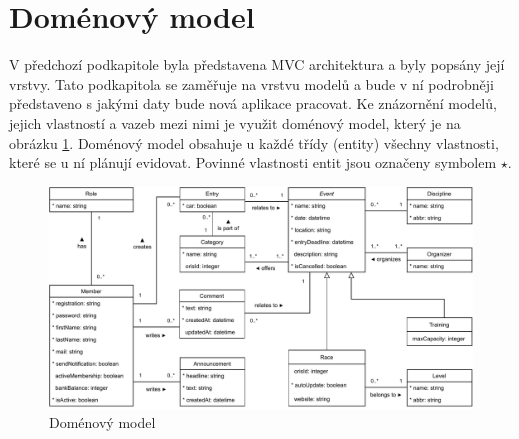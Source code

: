 \section{Doménový model}
V předchozí podkapitole byla představena MVC architektura a byly popsány její vrstvy. Tato podkapitola se zaměřuje na vrstvu modelů a bude v ní podrobněji představeno s jakými daty bude nová aplikace pracovat. Ke znázornění modelů, jejich vlastností a vazeb mezi nimi je využit doménový model, který je na obrázku \ref{figure:domain-model}. Doménový model obsahuje u každé třídy (entity) všechny vlastnosti, které se u ní plánují evidovat. Povinné vlastnosti entit jsou označeny symbolem $ \star $.

\begin{landscape}
	\begin{figure}[h]
		\caption{Doménový model}
		\label{figure:domain-model}
		\centering
		\includegraphics[width=0.96\linewidth]{images/domain-model.pdf}
	\end{figure}
\end{landscape}
